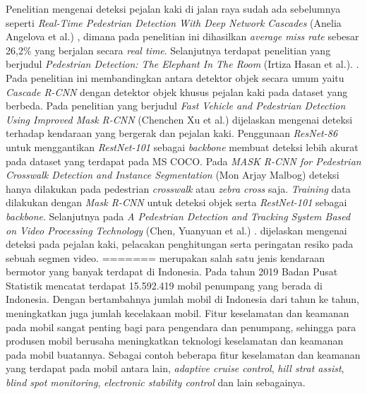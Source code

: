 \documentclass[conference]{IEEEtran}
\begin{document}
	Penelitian mengenai deteksi pejalan kaki di jalan raya sudah ada sebelumnya seperti \textit{Real-Time Pedestrian Detection With Deep Network Cascades} (Anelia Angelova et al.) \cite{cit:1}, dimana pada penelitian ini dihasilkan \textit{average miss rate} sebesar 26,2\% yang berjalan secara \textit{real time}. Selanjutnya terdapat penelitian yang berjudul \textit{Pedestrian Detection: The Elephant In The Room} (Irtiza Hasan et al.). \cite{cit:2}. Pada penelitian ini membandingkan antara detektor objek secara umum yaitu \textit{Cascade R-CNN} dengan detektor objek khusus pejalan kaki pada dataset yang berbeda. Pada penelitian yang berjudul \textit{Fast Vehicle and Pedestrian Detection Using Improved Mask R-CNN} (Chenchen Xu et al.) \cite{cit:3} dijelaskan mengenai deteksi terhadap kendaraan yang bergerak dan pejalan kaki. Penggunaan \textit{ResNet-86} untuk menggantikan \textit{RestNet-101} sebagai \textit{backbone} membuat deteksi lebih akurat pada dataset yang terdapat pada MS COCO. Pada \textit{MASK R-CNN for Pedestrian Crosswalk Detection and Instance Segmentation} (Mon Arjay Malbog) \cite{cit:4} deteksi hanya dilakukan pada pedestrian \textit{crosswalk} atau \textit{zebra cross} saja. \textit{Training} data dilakukan dengan \textit{Mask R-CNN }untuk deteksi objek serta \textit{RestNet-101} sebagai \textit{backbone}. Selanjutnya pada \textit{A Pedestrian Detection and Tracking System Based on Video Processing Technology} (Chen, Yuanyuan et al.) \cite{cit:5}. dijelaskan mengenai deteksi pada pejalan kaki, pelacakan penghitungan serta peringatan resiko pada sebuah segmen video. 
=======
	 merupakan salah satu jenis kendaraan bermotor yang banyak terdapat di Indonesia. Pada tahun 2019 Badan Pusat Statistik mencatat terdapat 15.592.419 mobil penumpang yang berada di Indonesia. Dengan bertambahnya jumlah mobil di Indonesia dari tahun ke tahun, meningkatkan juga jumlah kecelakaan mobil. Fitur keselamatan dan keamanan pada mobil sangat penting bagi para pengendara dan penumpang, sehingga para produsen mobil berusaha meningkatkan teknologi keselamatan dan keamanan pada mobil buatannya. Sebagai contoh beberapa fitur keselamatan dan keamanan yang terdapat pada mobil antara lain, \textit{adaptive cruise control}, \textit{hill strat assist}, \textit{blind spot monitoring}, \textit{electronic stability control} dan lain sebagainya.
	
	\vspace{1ex}
	
\end{document}
